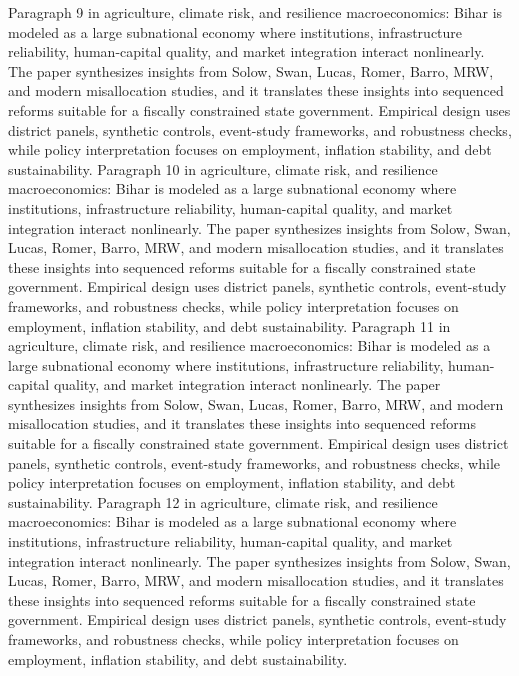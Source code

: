 \documentclass[preprint,12pt]{elsarticle}
\begin{document}
Paragraph 9 in agriculture, climate risk, and resilience macroeconomics: Bihar is modeled as a large subnational economy where institutions, infrastructure reliability, human-capital quality, and market integration interact nonlinearly. The paper synthesizes insights from Solow, Swan, Lucas, Romer, Barro, MRW, and modern misallocation studies, and it translates these insights into sequenced reforms suitable for a fiscally constrained state government. Empirical design uses district panels, synthetic controls, event-study frameworks, and robustness checks, while policy interpretation focuses on employment, inflation stability, and debt sustainability.
Paragraph 10 in agriculture, climate risk, and resilience macroeconomics: Bihar is modeled as a large subnational economy where institutions, infrastructure reliability, human-capital quality, and market integration interact nonlinearly. The paper synthesizes insights from Solow, Swan, Lucas, Romer, Barro, MRW, and modern misallocation studies, and it translates these insights into sequenced reforms suitable for a fiscally constrained state government. Empirical design uses district panels, synthetic controls, event-study frameworks, and robustness checks, while policy interpretation focuses on employment, inflation stability, and debt sustainability.
Paragraph 11 in agriculture, climate risk, and resilience macroeconomics: Bihar is modeled as a large subnational economy where institutions, infrastructure reliability, human-capital quality, and market integration interact nonlinearly. The paper synthesizes insights from Solow, Swan, Lucas, Romer, Barro, MRW, and modern misallocation studies, and it translates these insights into sequenced reforms suitable for a fiscally constrained state government. Empirical design uses district panels, synthetic controls, event-study frameworks, and robustness checks, while policy interpretation focuses on employment, inflation stability, and debt sustainability.
Paragraph 12 in agriculture, climate risk, and resilience macroeconomics: Bihar is modeled as a large subnational economy where institutions, infrastructure reliability, human-capital quality, and market integration interact nonlinearly. The paper synthesizes insights from Solow, Swan, Lucas, Romer, Barro, MRW, and modern misallocation studies, and it translates these insights into sequenced reforms suitable for a fiscally constrained state government. Empirical design uses district panels, synthetic controls, event-study frameworks, and robustness checks, while policy interpretation focuses on employment, inflation stability, and debt sustainability.
\end{document}
